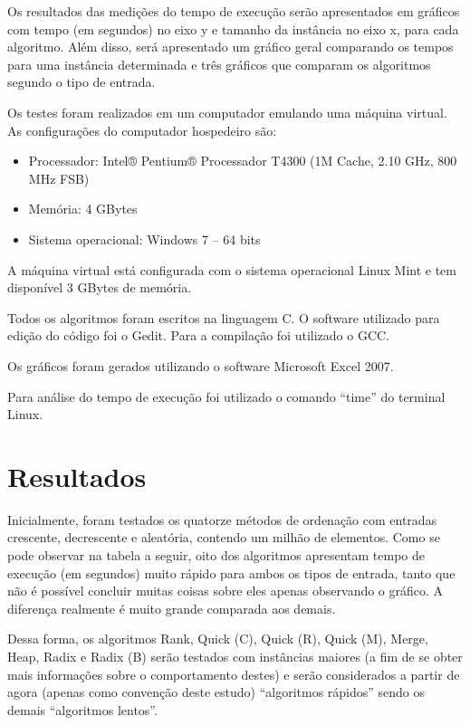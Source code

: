 \documentclass[12pt,a4paper]{article}
\begin{document}
Os resultados das medições do tempo de execução serão apresentados em gráficos com tempo (em segundos) no eixo y e tamanho da instância no eixo x, para cada algoritmo. Além disso, será apresentado um gráfico geral comparando os tempos para uma instância determinada e três gráficos que comparam os algoritmos segundo o tipo de entrada.

Os testes foram realizados em um computador emulando uma máquina virtual. As configurações do computador hospedeiro são:

\begin{itemize}
\item Processador: Intel® Pentium® Processador T4300 (1M Cache, 2.10 GHz, 800 MHz FSB)
\item Memória: 4 GBytes
\item Sistema operacional: Windows 7 – 64 bits
\end{itemize}
	

A máquina virtual está configurada com o sistema operacional Linux Mint e tem disponível 3 GBytes de memória.

Todos os algoritmos foram escritos na linguagem C. O software utilizado para edição do código foi o Gedit. Para a compilação foi utilizado o GCC.

Os gráficos foram gerados utilizando o software Microsoft Excel 2007.

Para análise do tempo de execução foi utilizado o comando “time” do terminal Linux. 








\section{Resultados}
Inicialmente, foram testados os quatorze métodos de ordenação com entradas crescente, decrescente e aleatória, contendo um milhão de elementos. Como se pode observar na tabela a seguir, oito dos algoritmos apresentam tempo de execução (em segundos) muito rápido para ambos os tipos de entrada, tanto que não é possível concluir muitas coisas sobre eles apenas observando o gráfico. A diferença realmente é muito grande comparada aos demais.

 Dessa forma, os algoritmos Rank, Quick (C), Quick (R), Quick (M), Merge, Heap, Radix e Radix (B) serão testados com instâncias maiores (a fim de se obter mais informações sobre o comportamento destes) e serão considerados a partir de agora (apenas como convenção deste estudo) “algoritmos rápidos” sendo os demais “algoritmos lentos”.
\end{document}
